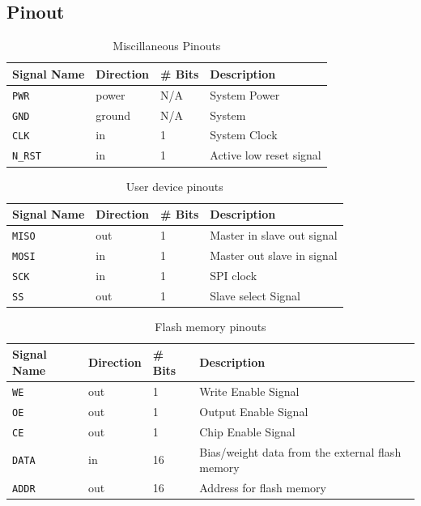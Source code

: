 \documentclass[12pt]{article}
\begin{document}
\subsection{Pinout}
\begin{table}[H]
    \centering
    \begin{tabular}[]{|l|l|l|p{250pt}|}
        \hline
        Signal Name & Direction & \# Bits & Description \\ \hline \hline
        \texttt{PWR} & power & N/A & System Power\\
        \texttt{GND} & ground & N/A & System \\
        \texttt{CLK} & in &1 & System Clock\\
        \texttt{N\_RST} & in & 1 & Active low reset signal\\\hline
    \end{tabular}
    \caption{Miscillaneous Pinouts}
    \label{tab:misc}
\end{table}

\begin{table}[H]
    \centering
    \begin{tabular}[]{|l|l|l|p{250pt}|}
        \hline
        Signal Name & Direction & \# Bits & Description \\ \hline \hline
        \texttt{MISO} & out & 1 & Master in slave out signal\\
        \texttt{MOSI} & in  & 1 & Master out slave in signal\\
        \texttt{SCK} & in & 1 & SPI clock\\
        \texttt{SS} & out& 1 & Slave select Signal\\\hline
    \end{tabular}
    \caption{User device pinouts}
    \label{tab:user}
\end{table}

\begin{table}[H]
    \centering
    \begin{tabular}[]{|l|l|l|p{250pt}|}
        \hline
        Signal Name & Direction & \# Bits & Description \\ \hline \hline
        \texttt{WE} & out & 1 & Write Enable Signal\\
        \texttt{OE} & out & 1 & Output Enable Signal\\
        \texttt{CE} & out& 1 & Chip Enable Signal\\
        \texttt{DATA} & in & 16 & Bias/weight data from the external flash memory\\
        \texttt{ADDR} & out & 16 & Address for flash memory\\\hline
    \end{tabular}
    \caption{Flash memory pinouts}
    \label{tab:flash}
\end{table}
\end{document}
